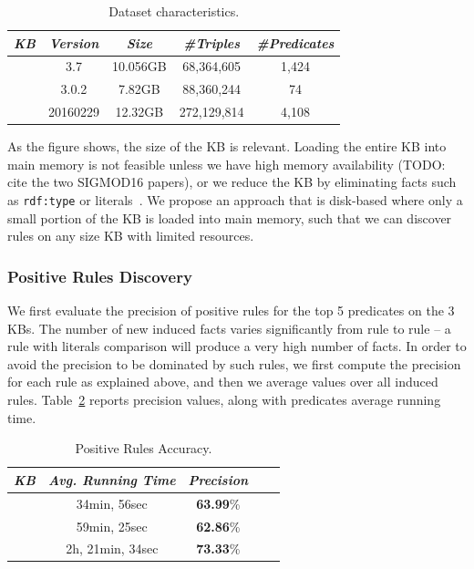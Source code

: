 \begin{table}[t]
	\centering
	\caption{Dataset characteristics.}
	\label{tab:krdDatasetDescr}
	\begin{small}
		\begin{tabular}
			{|c|c|c|c|c|}
			\hline
			\hline
			{\it KB}&{\it Version}&{\it Size}&{\it  \#Triples}&{\it \#Predicates} \tabularnewline
			\hline
			\dbpedia & 3.7 & 10.056GB & 68,364,605 & 1,424 \tabularnewline
			\yago & 3.0.2 & 7.82GB & 88,360,244 & 74 \tabularnewline
			\wikidata & 20160229 & 12.32GB & 272,129,814 & 4,108 \tabularnewline
			\hline
		\end{tabular}
	\end{small}
\end{table}
As the figure shows, the size of the KB is relevant. Loading the entire KB into main memory is not feasible unless we have high memory availability (TODO: cite the two SIGMOD16 papers),  or we reduce the KB by eliminating facts such as \texttt{rdf:type} or literals~\cite{galarraga2015fast}. We propose an approach that is disk-based where only a small portion of the KB is loaded into main memory, such that we can discover rules on any size KB with limited resources.

\subsubsection{Positive Rules Discovery} 
We first evaluate the precision of positive rules for the top 5 predicates on the 3 KBs. The number of new induced facts varies significantly from rule to rule -- a rule with literals comparison will produce a very high number of facts. In order to avoid the precision to be dominated by such rules, we first compute the precision for each rule as explained above, and then we average values over all induced rules. Table~\ref{tab:pos_rules_acc} reports precision values, along with predicates average running time.

\begin{table}[b]
	\centering
	\caption{Positive Rules Accuracy.}
	\label{tab:pos_rules_acc}
	\begin{tabular}{|c|c|c|c|c|}
		\hline
		\hline
		{\it KB}&{\it Avg. Running Time}&{\it Precision} \tabularnewline
		\hline
		\dbpedia & 34min, 56sec & \textbf{63.99}\%\tabularnewline
		\yago &  59min, 25sec & \textbf{62.86}\%\tabularnewline
		\wikidata &  2h, 21min, 34sec & \textbf{73.33}\%\tabularnewline
		\hline
	\end{tabular}
\end{table}


